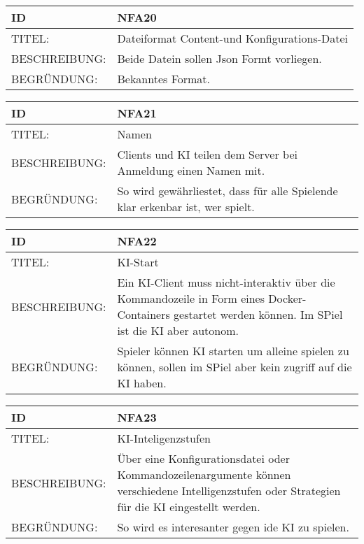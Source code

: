 \documentclass{uulm-assignment}
\begin{document}
    \begin{tabularx}{\textwidth}{|l|X |} \hline
        \textbf{ID} & \textbf{NFA20} \\
        \hline
        TITEL: &  Dateiformat Content-und Konfigurations-Datei\\
        \hline
        BESCHREIBUNG: &  Beide Datein sollen Json Formt vorliegen.\\
        \hline
        BEGRÜNDUNG: &  Bekanntes Format.\\
        \hline
    \end{tabularx}

    \begin{tabularx}{\textwidth}{|l|X |} \hline
        \textbf{ID} & \textbf{NFA21} \\
        \hline
        TITEL: &  Namen\\
        \hline
        BESCHREIBUNG: &  Clients und KI teilen dem Server bei Anmeldung einen Namen mit.\\
        \hline
        BEGRÜNDUNG: &  So wird gewährliestet, dass für alle Spielende klar erkenbar ist, wer spielt.\\
        \hline
    \end{tabularx}

    \begin{tabularx}{\textwidth}{|l|X |} \hline
        \textbf{ID} & \textbf{NFA22} \\
        \hline
        TITEL: &  KI-Start\\
        \hline
        BESCHREIBUNG: &  Ein KI-Client muss nicht-interaktiv über die Kommandozeile in Form eines Docker-Containers gestartet werden können. Im SPiel ist die KI aber autonom.\\
        \hline
        BEGRÜNDUNG: &  Spieler können KI starten um alleine spielen zu können, sollen im SPiel aber kein zugriff auf die KI haben.\\
        \hline
    \end{tabularx}
    
    \begin{tabularx}{\textwidth}{|l|X |} \hline
        \textbf{ID} & \textbf{NFA23} \\
        \hline
        TITEL: &  KI-Inteligenzstufen\\
        \hline
        BESCHREIBUNG: &  Über eine Konfigurationsdatei oder Kommandozeilenargumente können verschiedene
Intelligenzstufen oder Strategien für die KI eingestellt werden.\\
        \hline
        BEGRÜNDUNG: &  So wird es interesanter gegen ide KI zu spielen.\\
        \hline
    \end{tabularx}
\end{document}
